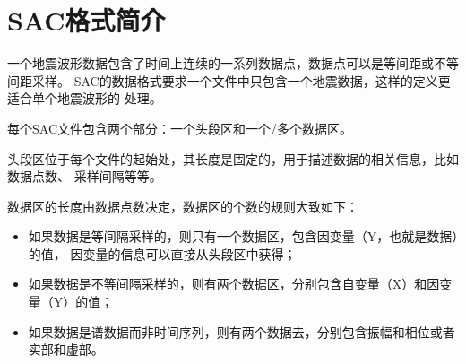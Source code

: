 \section{SAC格式简介}
一个地震波形数据包含了时间上连续的一系列数据点，数据点可以是等间距或不等间距采样。
SAC的数据格式要求一个文件中只包含一个地震数据，这样的定义更适合单个地震波形的
处理。

每个SAC文件包含两个部分：一个头段区和一个/多个数据区。

头段区位于每个文件的起始处，其长度是固定的，用于描述数据的相关信息，比如数据点数、
采样间隔等等。

数据区的长度由数据点数决定，数据区的个数的规则大致如下：
\begin{itemize}
\item 如果数据是等间隔采样的，则只有一个数据区，包含因变量（Y，也就是数据）的值，
    因变量的信息可以直接从头段区中获得；
\item 如果数据是不等间隔采样的，则有两个数据区，分别包含自变量（X）和因变量（Y）的值；
\item 如果数据是谱数据而非时间序列，则有两个数据去，分别包含振幅和相位或者实部和虚部。
\end{itemize}
